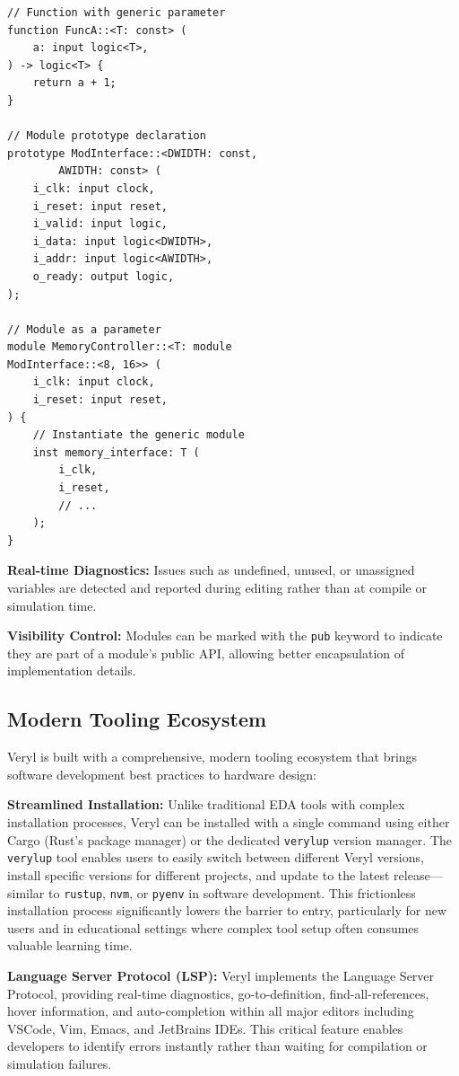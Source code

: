 \documentclass[conference]{IEEEtran}
\begin{document}
\begin{verbatim}
// Function with generic parameter
function FuncA::<T: const> (
    a: input logic<T>,
) -> logic<T> {
    return a + 1;
}

// Module prototype declaration
prototype ModInterface::<DWIDTH: const,
        AWIDTH: const> (
    i_clk: input clock,
    i_reset: input reset,
    i_valid: input logic,
    i_data: input logic<DWIDTH>,
    i_addr: input logic<AWIDTH>,
    o_ready: output logic,
);

// Module as a parameter
module MemoryController::<T: module
ModInterface::<8, 16>> (
    i_clk: input clock,
    i_reset: input reset,
) {
    // Instantiate the generic module
    inst memory_interface: T (
        i_clk,
        i_reset,
        // ...
    );
}
\end{verbatim}

\textbf{Real-time Diagnostics:} Issues such as undefined, unused, or unassigned
variables are detected and reported during editing rather than at compile or
simulation time.

\textbf{Visibility Control:} Modules can be marked with the \texttt{pub}
keyword to indicate they are part of a module's public API, allowing better
encapsulation of implementation details.

\subsection{Modern Tooling Ecosystem}
Veryl is built with a comprehensive, modern tooling ecosystem that brings
software development best practices to hardware design:

\textbf{Streamlined Installation:} Unlike traditional EDA tools with complex installation processes, Veryl can be installed with a single command using either Cargo (Rust's package manager) or the dedicated \texttt{verylup} version manager. The \texttt{verylup} tool enables users to easily switch between different Veryl versions, install specific versions for different projects, and update to the latest release—similar to \texttt{rustup}, \texttt{nvm}, or \texttt{pyenv} in software development. This frictionless installation process significantly lowers the barrier to entry, particularly for new users and in educational settings where complex tool setup often consumes valuable learning time.

\textbf{Language Server Protocol (LSP):} Veryl implements the Language Server
Protocol, providing real-time diagnostics, go-to-definition,
find-all-references, hover information, and auto-completion within all major
editors including VSCode, Vim, Emacs, and JetBrains IDEs. This critical feature
enables developers to identify errors instantly rather than waiting for
compilation or simulation failures.
\end{document}

